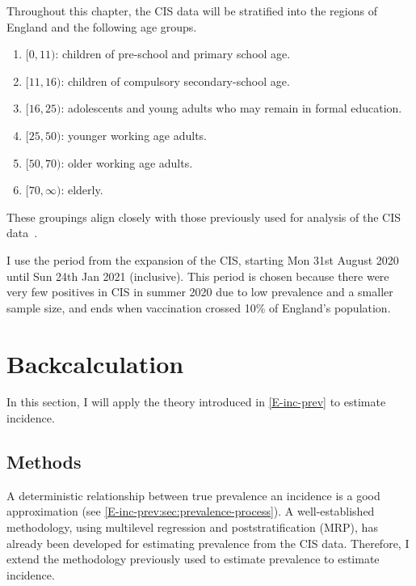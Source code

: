 \documentclass[thesis.tex]{subfiles}
\begin{document}
Throughout this chapter, the CIS data will be stratified into the regions of England and the following age groups.
\begin{enumerate}
    \item $[0, 11)$: children of pre-school and primary school age.
    \item $[11, 16)$: children of compulsory secondary-school age.
    \item $[16, 25)$: adolescents and young adults who may remain in formal education.
    \item $[25, 50)$: younger working age adults.
    \item $[50, 70)$: older working age adults.
    \item $[70, \infty)$: elderly.
\end{enumerate}
These groupings align closely with those previously used for analysis of the CIS data~\autocites[e.g.:][]{houseInferring}{walkerTracking}.

I use the period from the expansion of the CIS, starting Mon 31st August 2020 until Sun 24th Jan 2021 (inclusive).
This period is chosen because there were very few positives in CIS in summer 2020 due to low prevalence and a smaller sample size, and ends when vaccination crossed 10\% of England's population.

\section{Backcalculation} \label{backcalc}

In this section, I will apply the theory introduced in \cref{E-inc-prev} to estimate incidence.


\subsection{Methods} \label{backcalc:sec:methods}

A deterministic relationship between true prevalence an incidence is a good approximation (see \cref{E-inc-prev:sec:prevalence-process}).
A well-established methodology, using multilevel regression and poststratification (MRP), has already been developed for estimating prevalence from the CIS data.
Therefore, I extend the methodology previously used to estimate prevalence to estimate incidence.
\end{document}
